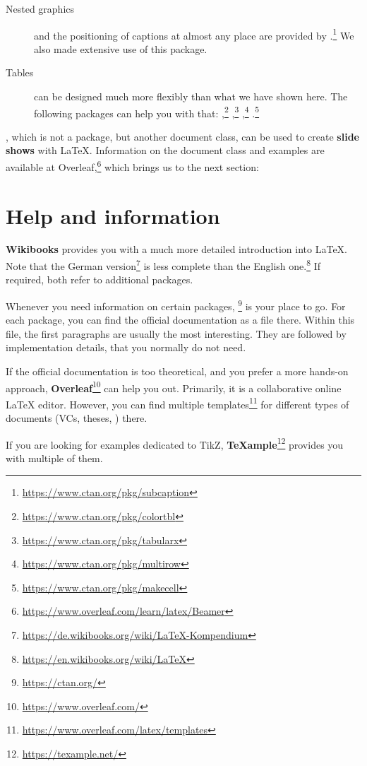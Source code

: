 \begin{description}
	\item[Nested graphics]
		and the positioning of captions at almost any place are provided by  
		.\footnote{\url{https://www.ctan.org/pkg/subcaption}}
		We also made extensive use of this package.
	\item[Tables]
		can be designed much more flexibly than what we have shown here. 
		The following packages can help you with that:
		,\footnote{\url{https://www.ctan.org/pkg/colortbl}}
		,\footnote{\url{https://www.ctan.org/pkg/tabularx}}
		,\footnote{\url{https://www.ctan.org/pkg/multirow}}
		.\footnote{\url{https://www.ctan.org/pkg/makecell}}
\end{description}

\noindent {}, which is not a package, but another document class, can be used to create \textbf{slide shows}
with \LaTeX{}. Information on the document class and examples are available at Overleaf,\footnote{\url{https://www.overleaf.com/learn/latex/Beamer}} which brings us to the next section:

\section{Help and information}

\textbf{Wikibooks} provides you with a much more detailed introduction into \LaTeX{}. Note that the German version\footnote{\url{https://de.wikibooks.org/wiki/LaTeX-Kompendium}} is less complete than the English one.\footnote{\url{https://en.wikibooks.org/wiki/LaTeX}}
If required, both refer to additional packages.

Whenever you need information on certain packages, \footnote{\url{https://ctan.org/}} is your place to go. 
For each package, you can find the official documentation as a  file there.
Within this file, the first paragraphs are usually the most interesting. They are 
followed by implementation details, that you normally do not need.

If the official documentation is too theoretical, and you prefer a more hands-on approach, \textbf{Overleaf}\footnote{\url{https://www.overleaf.com/}} can help you out.
Primarily, it is a collaborative online \LaTeX{} editor. However, you can find multiple templates\footnote{\url{https://www.overleaf.com/latex/templates}} for different types of documents (VCs, theses, \textellipsis) there.

If you are looking for examples dedicated to TikZ, \textbf{\TeX{}ample}\footnote{\url{https://texample.net/}} provides you with multiple of them.

